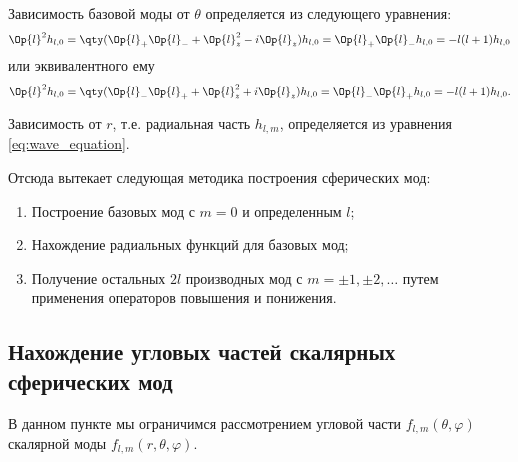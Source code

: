     Зависимость базовой моды от $\theta$ определяется из следующего уравнения:
    \begin{equation}\label{eq:basemode_op_eq}
        \Op{l}^2 h_{l, 0}
            = \qty( \Op{l}_{+} \Op{l}_{-} + \Op{l}_z^2 - i \Op{l}_z ) h_{l, 0}
            = \Op{l}_{+} \Op{l}_{-} h_{l, 0}
            = - l (l + 1) h_{l, 0}
    \end{equation}
    или эквивалентного ему
    \begin{equation}
        \Op{l}^2 h_{l, 0}
            = \qty( \Op{l}_{-} \Op{l}_{+} + \Op{l}_z^2 + i \Op{l}_z ) h_{l, 0}
            = \Op{l}_{-} \Op{l}_{+} h_{l, 0}
            = - l (l + 1) h_{l, 0} .
    \end{equation}

    Зависимость от $r$, т.е. радиальная часть $h_{l, m}$, определяется из уравнения \autoref{eq:wave_equation}.

    Отсюда вытекает следующая методика построения сферических мод:
    \begin{enumerate}[noitemsep]
        \item Построение базовых мод с $m = 0$ и определенным $l$;
        \item Нахождение радиальных функций для базовых мод;
        \item Получение остальных $2l$ производных мод с $m = \pm 1, \pm 2, \dots$ путем применения операторов повышения и понижения.
    \end{enumerate}

%
%
%
%
%
%

\subsection{Нахождение угловых частей скалярных сферических мод}

    В данном пункте мы ограничимся рассмотрением угловой части $f_{l,m}(\theta, \varphi)$ скалярной моды $f_{l,m}(r, \theta, \varphi)$.

